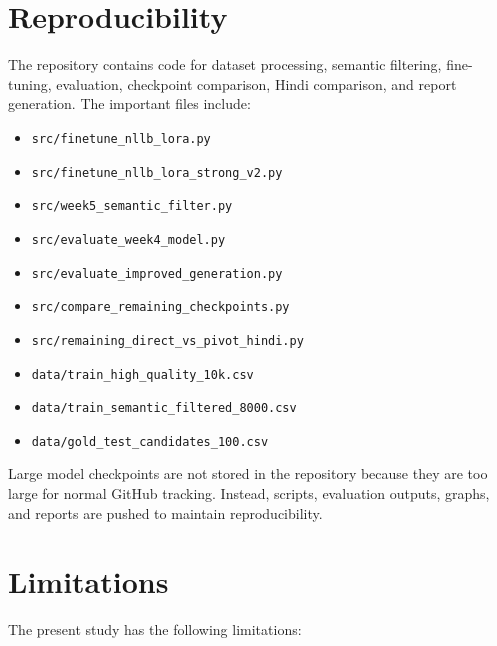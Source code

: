 \documentclass[conference]{IEEEtran}
\begin{document}
\section{Reproducibility}

The repository contains code for dataset processing, semantic filtering, fine-tuning, evaluation, checkpoint comparison, Hindi comparison, and report generation. The important files include:

\begin{itemize}
    \item \texttt{src/finetune\_nllb\_lora.py}
    \item \texttt{src/finetune\_nllb\_lora\_strong\_v2.py}
    \item \texttt{src/week5\_semantic\_filter.py}
    \item \texttt{src/evaluate\_week4\_model.py}
    \item \texttt{src/evaluate\_improved\_generation.py}
    \item \texttt{src/compare\_remaining\_checkpoints.py}
    \item \texttt{src/remaining\_direct\_vs\_pivot\_hindi.py}
    \item \texttt{data/train\_high\_quality\_10k.csv}
    \item \texttt{data/train\_semantic\_filtered\_8000.csv}
    \item \texttt{data/gold\_test\_candidates\_100.csv}
\end{itemize}

Large model checkpoints are not stored in the repository because they are too large for normal GitHub tracking. Instead, scripts, evaluation outputs, graphs, and reports are pushed to maintain reproducibility.

\section{Limitations}

The present study has the following limitations:
\end{document}
